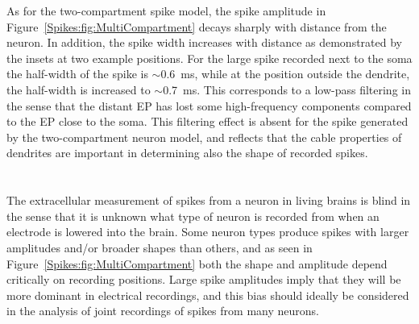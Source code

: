As for the two-compartment spike model, the spike amplitude in Figure~\ref{Spikes:fig:MultiCompartment} 
decays sharply with distance from the neuron. In addition, the spike width increases
with distance as demonstrated by the insets at two example positions. For the large spike recorded next to
the soma the half-width of the spike is $\sim$0.6~ms, while at the position outside the dendrite, the half-width is increased to
$\sim$0.7~ms. This corresponds to a low-pass filtering in the sense that the distant EP has lost some 
high-frequency components compared to the EP close to the soma. This filtering effect is absent for the spike generated by the 
two-compartment neuron model, and reflects that the cable properties of dendrites are important in determining 
also the shape of recorded spikes.   



\section{}
\label{Spikes:sec:spike-widths-amplitudes}
The extracellular measurement of spikes from a neuron in living brains is blind in the sense that it is
unknown what type of neuron is recorded from when an electrode is lowered into the brain.
Some neuron types produce spikes with larger amplitudes and/or broader shapes than
others, and as seen in Figure~\ref{Spikes:fig:MultiCompartment} both the shape and amplitude 
depend critically on recording positions. Large spike amplitudes imply that they will be more dominant in electrical recordings,
and this bias should ideally be considered in the analysis of joint recordings 
of spikes from many neurons.

